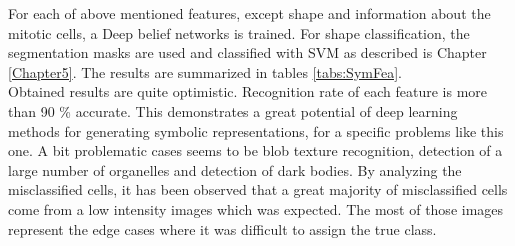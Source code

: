 For each of above mentioned features, except shape and information about the mitotic cells, a Deep belief networks is trained. For shape classification, the segmentation masks are used and classified with SVM as described is Chapter \ref{Chapter5}. The results are summarized in tables \ref{tabs:SymFea}. \\

Obtained results are quite optimistic. Recognition rate of each feature is more than 90 \% accurate. This demonstrates a great potential of deep learning methods for generating symbolic representations, for a specific problems like this one. A bit problematic cases seems to be blob texture recognition, detection of a large number of organelles and detection of dark bodies. By analyzing the misclassified cells, it has been observed that a great majority of misclassified cells come from a low intensity images which was expected. The most of those images represent the edge cases where it was difficult to assign the true class.


